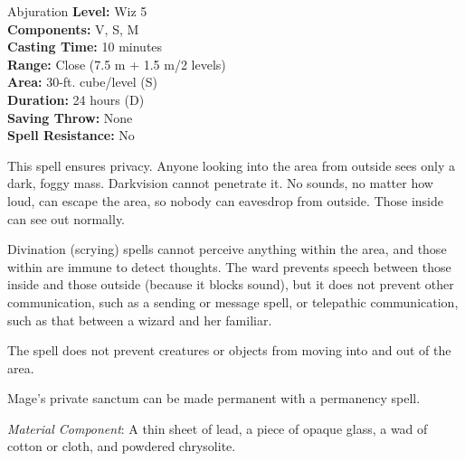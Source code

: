 {Abjuration}
{
	\textbf{Level:}
	Wiz 5\\
	\textbf{Components:}
	V, S, M\\
	\textbf{Casting Time:}
	10 minutes\\
	\textbf{Range:}
	Close (7.5 m + 1.5 m/2 levels)\\
	\textbf{Area:}
	30-ft. cube/level (S)\\
	\textbf{Duration:}
	24 hours (D)\\
	\textbf{Saving Throw:}
	None\\
	\textbf{Spell Resistance:}
	No\\
}
{
	This spell ensures privacy. Anyone looking into the area from outside sees only a dark, foggy mass. Darkvision cannot penetrate it. No sounds, no matter how loud, can escape the area, so nobody can eavesdrop from outside. Those inside can see out normally.

	Divination (scrying) spells cannot perceive anything within the area, and those within are immune to detect thoughts. The ward prevents speech between those inside and those outside (because it blocks sound), but it does not prevent other communication, such as a sending or message spell, or telepathic communication, such as that between a wizard and her familiar.

	The spell does not prevent creatures or objects from moving into and out of the area.

	Mage's private sanctum can be made permanent with a permanency spell.

	\textit{Material Component}:
	A thin sheet of lead, a piece of opaque glass, a wad of cotton or cloth, and powdered chrysolite.

}
